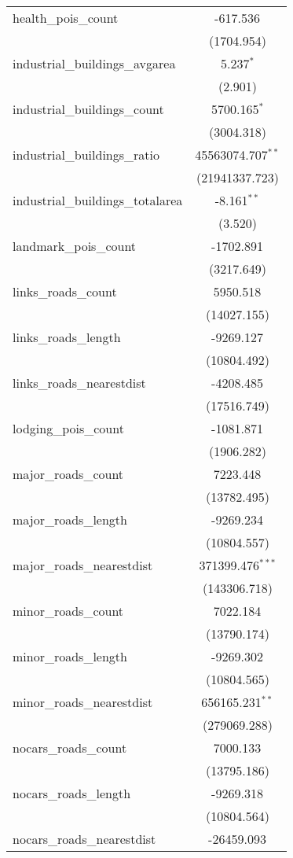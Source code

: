 \begin{table}[!htbp]
\begin{tabular}{@{\extracolsep{5pt}}lc}
 health_pois_count & -617.536$^{}$ \\
  & (1704.954) \\
 industrial_buildings_avgarea & 5.237$^{*}$ \\
  & (2.901) \\
 industrial_buildings_count & 5700.165$^{*}$ \\
  & (3004.318) \\
 industrial_buildings_ratio & 45563074.707$^{**}$ \\
  & (21941337.723) \\
 industrial_buildings_totalarea & -8.161$^{**}$ \\
  & (3.520) \\
 landmark_pois_count & -1702.891$^{}$ \\
  & (3217.649) \\
 links_roads_count & 5950.518$^{}$ \\
  & (14027.155) \\
 links_roads_length & -9269.127$^{}$ \\
  & (10804.492) \\
 links_roads_nearestdist & -4208.485$^{}$ \\
  & (17516.749) \\
 lodging_pois_count & -1081.871$^{}$ \\
  & (1906.282) \\
 major_roads_count & 7223.448$^{}$ \\
  & (13782.495) \\
 major_roads_length & -9269.234$^{}$ \\
  & (10804.557) \\
 major_roads_nearestdist & 371399.476$^{***}$ \\
  & (143306.718) \\
 minor_roads_count & 7022.184$^{}$ \\
  & (13790.174) \\
 minor_roads_length & -9269.302$^{}$ \\
  & (10804.565) \\
 minor_roads_nearestdist & 656165.231$^{**}$ \\
  & (279069.288) \\
 nocars_roads_count & 7000.133$^{}$ \\
  & (13795.186) \\
 nocars_roads_length & -9269.318$^{}$ \\
  & (10804.564) \\
 nocars_roads_nearestdist & -26459.093$^{}$ \\

\end{tabular}
\end{table}
